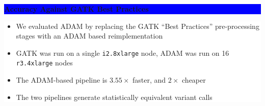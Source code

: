 \documentclass[11pt]{a0poster}
\begin{document}
{\begin{minipage}[t][2045pt][t]{\linewidth}
\begin{minipage}{0.6\linewidth}
\vspace{75pt}
\begin{minipage}{\linewidth}
\colorbox{Blue}{
\begin{minipage}[t]{\linewidth}
\vspace{30pt}
\begin{center}
\Huge \bf \color{White} Accuracy Against GATK Best Practices
\end{center}
\vspace{17pt}
\end{minipage}
}
\colorbox{White}{
\begin{minipage}[t][590pt][t]{\linewidth}
\begin{minipage}{0.005\linewidth}
\hfill
\pagebreak
\end{minipage}
\begin{minipage}{0.55\linewidth}
\LARGE
\color{Blue}
\begin{itemize}
\item We evaluated ADAM by replacing the GATK ``Best Practices'' pre-processing
stages with an ADAM based reimplementation
\item GATK was run on a single \texttt{i2.8xlarge} node, ADAM was run on 16
\texttt{r3.4xlarge} nodes
\item The ADAM-based pipeline is $3.55\times$ faster, and $2\times$ cheaper
\item The two pipelines generate statistically equivalent variant calls
\end{itemize}


\end{minipage}
\end{minipage}}
\end{minipage}
\end{minipage}
\end{minipage}}
\end{document}

